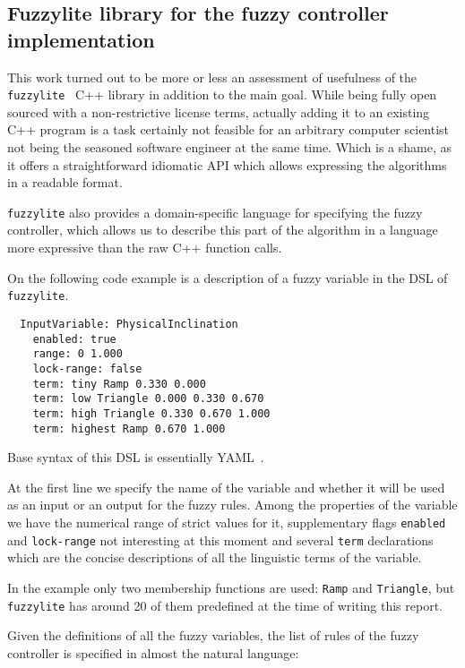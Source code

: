 \documentclass[11pt, a4paper]{article}
\begin{document}
	\subsection{Fuzzylite library for the fuzzy controller implementation}

	This work turned out to be more or less an assessment of usefulness of the \texttt{fuzzylite}~\cite{fl::fuzzylite} C++ library in addition to the main goal.
	While being fully open sourced with a non-restrictive license terms, actually adding it to an existing C++ program is a task certainly not feasible for an arbitrary computer scientist not being the seasoned software engineer at the same time.
	Which is a shame, as it offers a straightforward idiomatic API which allows expressing the algorithms in a readable format.

	\texttt{fuzzylite} also provides a domain-specific language for specifying the fuzzy controller, which allows us to describe this part of the algorithm in a language more expressive than the raw C++ function calls.

  On the following code example is a description of a fuzzy variable in the DSL of \texttt{fuzzylite}.

  \begin{verbatim}
  InputVariable: PhysicalInclination
    enabled: true
    range: 0 1.000
    lock-range: false
    term: tiny Ramp 0.330 0.000
    term: low Triangle 0.000 0.330 0.670
    term: high Triangle 0.330 0.670 1.000
    term: highest Ramp 0.670 1.000
  \end{verbatim}

  Base syntax of this DSL is essentially YAML~\cite{YAML}.

  At the first line we specify the name of the variable and whether it will be used as an input or an output for the fuzzy rules.
  Among the properties of the variable we have the numerical range of strict values for it, supplementary flags \texttt{enabled} and \texttt{lock-range} not interesting at this moment
  and several \texttt{term} declarations which are the concise descriptions of all the linguistic terms of the variable.

  In the example only two membership functions are used: \texttt{Ramp} and \texttt{Triangle}, but \texttt{fuzzylite} has around 20 of them predefined at the time of writing this report.
  
  Given the definitions of all the fuzzy variables, the list of rules of the fuzzy controller is specified in almost the natural language:
\end{document}
